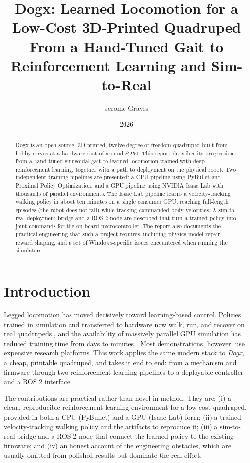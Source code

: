 \documentclass[11pt]{article}
\title{\textbf{Dogx: Learned Locomotion for a Low-Cost 3D-Printed Quadruped}\\
\large From a Hand-Tuned Gait to Reinforcement Learning and Sim-to-Real}
\author{Jerome Graves}
\date{2026}
\begin{document}
\maketitle

\begin{abstract}
\noindent
Dogx is an open-source, 3D-printed, twelve degree-of-freedom quadruped built
from hobby servos at a hardware cost of around \pounds 250. This report describes
its progression from a hand-tuned sinusoidal gait to learned locomotion trained
with deep reinforcement learning, together with a path to deployment on the
physical robot. Two independent training pipelines are presented: a CPU pipeline
using PyBullet and Proximal Policy Optimization, and a GPU pipeline using NVIDIA
Isaac Lab with thousands of parallel environments. The Isaac Lab pipeline learns
a velocity-tracking walking policy in about ten minutes on a single consumer GPU,
reaching full-length episodes (the robot does not fall) while tracking commanded
body velocities. A sim-to-real deployment bridge and a ROS 2 node are described
that turn a trained policy into joint commands for the on-board microcontroller.
The report also documents the practical engineering that such a project requires,
including physics-model repair, reward shaping, and a set of Windows-specific
issues encountered when running the simulators.
\end{abstract}

\section{Introduction}
Legged locomotion has moved decisively toward learning-based control. Policies
trained in simulation and transferred to hardware now walk, run, and recover on
real quadrupeds \cite{hwangbo2019anymal}, and the availability of massively
parallel GPU simulation has reduced training time from days to
minutes \cite{rudin2022minutes}. Most demonstrations, however, use expensive
research platforms. This work applies the same modern stack to \emph{Dogx}, a
cheap, printable quadruped, and takes it end to end: from a mechanism and
firmware through two reinforcement-learning pipelines to a deployable controller
and a ROS 2 interface.

The contributions are practical rather than novel in method. They are: (i) a
clean, reproducible reinforcement-learning environment for a low-cost quadruped,
provided in both a CPU (PyBullet) and a GPU (Isaac Lab) form; (ii) a trained
velocity-tracking walking policy and the artifacts to reproduce it; (iii) a
sim-to-real bridge and a ROS 2 node that connect the learned policy to the
existing firmware; and (iv) an honest account of the engineering obstacles, which
are usually omitted from polished results but dominate the real effort.
\end{document}
